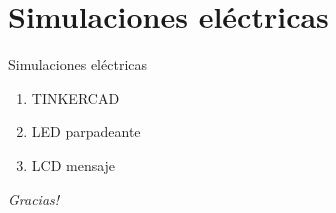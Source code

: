 \documentclass[xcolor=dvipsnames,envcountsect]{beamer}
\begin{document}
\section{Simulaciones eléctricas}
\begin{frame}{Simulaciones eléctricas}
		\begin{enumerate}
			\item TINKERCAD
			\item LED parpadeante
			\item LCD mensaje
		\end{enumerate}		
\end{frame}





	\begin{frame}
		\centering
		\begin{block}
			\scshape
				\begin{center}
					\Huge\emph{Gracias!}
				\end{center}
		\end{block}
	\end{frame}
\end{document}

